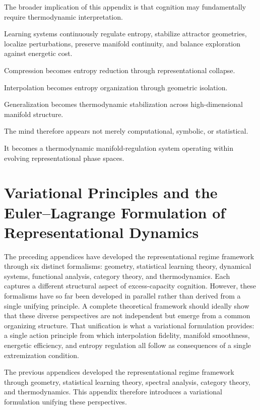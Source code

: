 \documentclass[12pt,a4paper]{article}
\begin{document}
The broader implication of this appendix is that cognition may fundamentally require thermodynamic interpretation.

Learning systems continuously regulate entropy, stabilize attractor geometries, localize perturbations, preserve manifold continuity, and balance exploration against energetic cost.

Compression becomes entropy reduction through representational collapse.

Interpolation becomes entropy organization through geometric isolation.

Generalization becomes thermodynamic stabilization across high-dimensional manifold structure.

The mind therefore appears not merely computational, symbolic, or statistical.

It becomes a thermodynamic manifold-regulation system operating within evolving representational phase spaces.


\section{Variational Principles and the Euler--Lagrange Formulation of Representational Dynamics}

The preceding appendices have developed the representational regime framework through six distinct formalisms: geometry, statistical learning theory, dynamical systems, functional analysis, category theory, and thermodynamics. Each captures a different structural aspect of excess-capacity cognition. However, these formalisms have so far been developed in parallel rather than derived from a single unifying principle. A complete theoretical framework should ideally show that these diverse perspectives are not independent but emerge from a common organizing structure. That unification is what a variational formulation provides: a single action principle from which interpolation fidelity, manifold smoothness, energetic efficiency, and entropy regulation all follow as consequences of a single extremization condition.

The previous appendices developed the representational regime framework through geometry, statistical learning theory, spectral analysis, category theory, and thermodynamics. This appendix therefore introduces a variational formulation unifying these perspectives.
\end{document}
